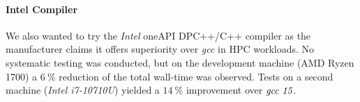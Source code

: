 	\paragraph{Intel Compiler}
		We also wanted to try the \emph{Intel\textsuperscript{\tiny\textregistered}} oneAPI DPC++/C++ compiler as the manufacturer claims it offers superiority over \emph{gcc} in HPC workloads. No systematic testing was conducted, but on the development machine (AMD Ryzen 1700) a $\SI{6}{\percent}$ reduction of the total wall-time was observed. Tests on a second machine (\emph{Intel\textsuperscript{\tiny\textregistered} i7-10710U}) yielded a $\SI{14}{\percent}$ improvement over $\emph{gcc 15}$.
			
	


	